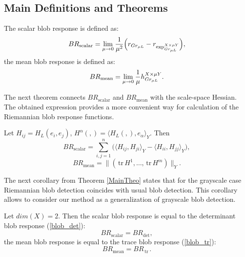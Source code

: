 \documentclass{llncs}
\newcommand{\FRScalar}{BR_{\mathrm{scalar}}}
\newcommand{\FRMean}{BR_{\mathrm{mean}}}
\newcommand {\tr}{{\,}\mathrm{tr}{\,}}
\begin{document}
\subsection{Main Definitions and Theorems}

\begin{definition} \label{RiemanDef}
The scalar blob response is defined as:
\begin{equation*}\FRScalar=\lim_{\mu\to 0} \frac{1}{\mu ^ 2} \Big( r_{Gr_{\mu L}} - r_{\tensor*{\exp}{^{X\times\mu Y}_{Gr_{\mu L}}}} \Big),\end{equation*}
the mean blob response is defined as:
\begin{equation*}\FRMean=\lim_{\mu\to 0} \frac{1}{\mu } \tensor*{h}{^{X\times\mu Y}_{Gr_{\mu L}}}.\end{equation*}
\end{definition}

The next theorem connects $\FRScalar$ and $\FRMean$ with the scale-space Hessian. The obtained expression provides a more convenient way for calculation of the Riemannian blob response functions.

\begin{theorem} \label{MainTheo}
Let $H_{ij}=H_L (e_i,e_j)$, $H^\alpha (,) =\langle H_L (,),e_\alpha {\rangle}_Y$. Then
\begin{equation*}\FRScalar=\sum_{i,j=1}^{n} \Big( \langle H_{ij},H_{ji}{\rangle}_Y-\langle H_{ii},H_{jj}{\rangle}_Y \Big) ,\end{equation*}
\begin{equation*}\FRMean=\| (\tr H^1,\dots,\tr H^m )\|_Y.\end{equation*}
\end{theorem}

The next corollary from Theorem \ref{MainTheo} states that for the grayscale case Riemannian blob detection coincides with usual blob detection. This corollary allows to consider our method as a generalization of grayscale blob detection.

\begin{corollary}\label{GrayscaleCol}
Let $dim(X)=2$. Then the scalar blob response is equal to the determinant blob response (\ref{blob_det}):
\begin{equation*}\FRScalar=BR_{\det},\end{equation*}
the mean blob response is equal to the trace blob response (\ref{blob_tr}):
\begin{equation*}\FRMean=BR_{\tr}.\end{equation*}
\end{corollary}
\end{document}
